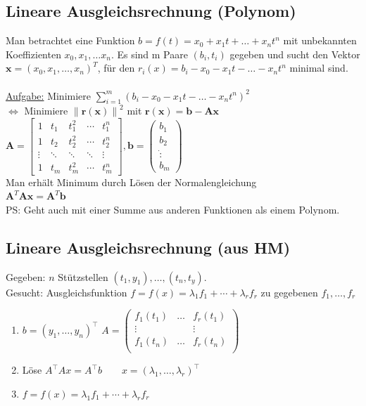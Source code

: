 \documentclass[6pt,a4paper]{scrartcl}
\let\olddot = \dot
\newcommand{\norm}[1]{\ensuremath{\|#1\|}}                                                      %
\newcommand{\mat}[1]{\ensuremath{\begin{bmatrix} #1 \end{bmatrix}}}                             %
\newcommand{\ma}[1]{\ensuremath{\boldsymbol {#1}}}                                              %
\newcommand{\vect}[1]{\ensuremath{\begin{pmatrix} #1 \end{pmatrix}}}                            %
\newcommand{\svdots}{\ensuremath{\olddot :}}                                                    %
\renewcommand{\vec}[1]{\ensuremath{\boldsymbol {#1}}}                                           %
\renewcommand*{\dot}[1]{\accentset{\mbox{\textrm{\large\bfseries .}} }{#1}}                     %
\begin{document}
\begin{multicols*}{4}
    \subsection{Lineare Ausgleichsrechnung (Polynom)}
    Man betrachtet eine Funktion $b = f(t) = x_0 + x_1t + \ldots + x_nt^n$ mit unbekannten Koeffizienten $x_0, x_1, \ldots x_n$. Es sind m Paare $(b_i, t_i)$ gegeben und sucht
    den Vektor $\vec x = (x_0, x_1, \ldots, x_n)^T$, für den $r_i(x) = b_i - x_0 - x_1t - \ldots - x_nt^n$ minimal sind. \\ \\
    \underline{Aufgabe:} Minimiere $\sum\limits_{i = 1}^m (b_i - x_0 - x_1t - \ldots - x_nt^n)^2$ \\
    $\Leftrightarrow$ Minimiere $\norm{\vec r(\vec x)}^2$ mit $\vec r(\vec x) = \vec b - \ma A \vec x$ \\
    $\ma A = \mat{
            1 & t_1 & t_1^2 & \cdots & t_1^n \\
            1 & t_2 & t_2^2 & \cdots & t_2^n \\
            \vdots & \ddots & \ddots & \ddots & \vdots \\
            1 & t_m & t_m^2 & \cdots & t_m^n
        }, \vec b = \vect{b_1 \\ b_2 \\ \svdots \\ b_m}$ \\
    Man erhält Minimum durch Lösen der Normalengleichung \\
    $\boxed{\ma A^T \ma A \vec x = \ma A^T \vec b}$\\
    PS: Geht auch mit einer Summe aus anderen Funktionen als einem Polynom.

    \subsection{Lineare Ausgleichsrechnung (aus HM)}
    Gegeben: $n$ Stützstellen $(t_1,y_1),\dots,(t_n,t_y)$. \\
    Gesucht: Ausgleichsfunktion $f=f(x)=\lambda_1 f_1 +\cdots+\lambda_r f_r$ zu gegebenen $f_1,\dots,f_r$
    \begin{enumerate}
        \item $b = (y_1,\dots,y_n)^\top$ \qquad $A=\begin{pmatrix}
                      f_1(t_1) & \dots & f_r(t_1) \\
                      \vdots   &       & \vdots   \\
                      f_1(t_n) & \dots & f_r(t_n) \\
                  \end{pmatrix}$
        \item Löse $A^\top Ax=A^\top b \qquad x=(\lambda_1,\dots,\lambda_r)^\top$
        \item $f=f(x)=\lambda_1 f_1 +\cdots+\lambda_r f_r$
    \end{enumerate}
    \fi


\end{multicols*}
\end{document}
